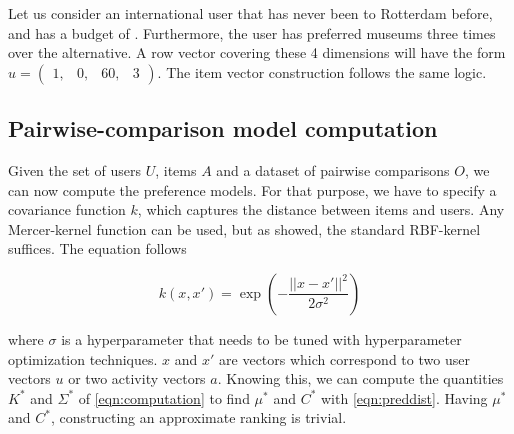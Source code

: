 \documentclass[11pt,a4paper,oneside]{article}
\begin{document}
Let us consider an international user that has never been to Rotterdam before, and has a budget of . Furthermore, the user has preferred museums three times over the alternative. A row vector covering these 4 dimensions will have the form $u = \left(\begin{smallmatrix} 1, & 0, & 60, & 3 \end{smallmatrix}\right)$. The item vector construction follows the same logic. 

\subsection{Pairwise-comparison model computation}
Given the set of users $U$, items $A$ and a dataset of pairwise comparisons $O$, we can now compute the preference models. For that purpose, we have to specify a covariance function $k$, which captures the distance between items and users. Any Mercer-kernel function can be used, but as \citeauthor{guo_GaussianProcessPreference_2010} showed, the standard RBF-kernel suffices. The equation follows 

\begin{equation}
k(x, x') = \exp\left(-\frac{|| x - x' ||^2}{2\sigma^2}\right)
\end{equation}

where $\sigma$ is a hyperparameter that needs to be tuned with hyperparameter optimization techniques. $x$ and $x' $ are vectors which correspond to two user vectors $u$ or two activity vectors $a$. Knowing this, we can compute the quantities $K^*$ and $\Sigma^*$ of \autoref{eqn:computation} to find $\mu^*$ and $C^*$ with \autoref{eqn:preddist}. Having $\mu^*$ and $C^*$, constructing an approximate ranking is trivial. 
\end{document}
